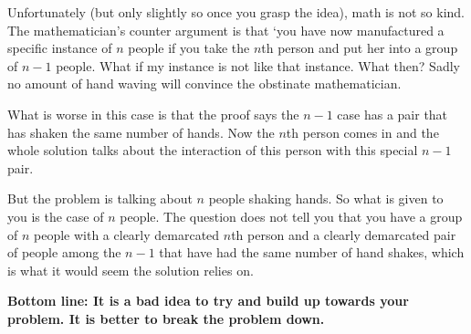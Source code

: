 \documentclass[12pt]{article}
\begin{document}
Unfortunately (but only slightly so once you grasp the idea), math is not so kind. The mathematician's counter argument is that `you have now manufactured a specific instance of $n$ people if you take the $n$th person and put her into a group of $n-1$ people. What if my instance is not like that instance. What then? Sadly no amount of hand waving will convince the obstinate mathematician. 

What is worse in this case is that the proof says the $n-1$ case has a pair that has shaken the same number of hands. Now the $n$th person comes in and the whole solution talks about the interaction of this person with this special $n-1$ pair. 

But the problem is talking about $n$ people shaking hands. So what is given to you is the case of $n$ people. The question does not tell you that you have a group of $n$ people with a clearly demarcated $n$th person and a clearly demarcated pair of people among the $n-1$ that have had the same number of hand shakes, which is what it would seem the solution relies on.

\textbf {Bottom line: It is a bad idea to try and build up towards your problem. It is better to break the problem down.}
\end{document}
